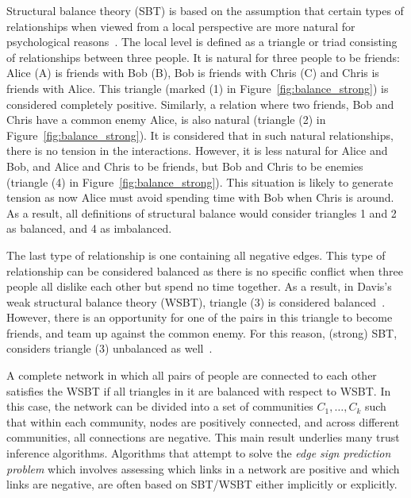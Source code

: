 Structural balance theory (SBT) is based on the assumption that
certain types of relationships when viewed from a local perspective
are more natural for psychological reasons~\cite{kleinberg-book}. The
local level is defined as a triangle or triad consisting of
relationships between three people.  It is natural for three people to
be friends: Alice (A) is friends with Bob (B), Bob is friends with
Chris (C) and Chris is friends with Alice. This triangle (marked (1)
in Figure~\ref{fig:balance_strong}) is considered completely
positive. Similarly, a relation where two friends, Bob and Chris have
a common enemy Alice, is also natural (triangle (2) in
Figure~\ref{fig:balance_strong}). It is considered that in such
natural relationships, there is no tension in the
interactions. However, it is less natural for Alice and Bob, and Alice
and Chris to be friends, but Bob and Chris to be enemies (triangle (4)
in Figure~\ref{fig:balance_strong}). This situation is likely to
generate tension as now Alice must avoid spending time with Bob when
Chris is around. As a result, all definitions of structural balance
would consider triangles 1 and 2 as balanced, and 4 as imbalanced.

The last type of relationship is one containing all negative
edges. This type of relationship can be considered balanced as there
is no specific conflict when three people all dislike each other but
spend no time together. As a result, in Davis's weak structural balance theory
(WSBT), triangle (3) is considered balanced~\cite{kleinberg-book}\cite{Davis:67}.  However, there is an
opportunity for one of the pairs in this triangle to become friends,
and team up against the common enemy. For this reason, (strong) SBT,
considers triangle (3) unbalanced as well~\cite{Cartwright:56}\cite{kleinberg-book}.

A complete network in which all pairs of people are connected to each
other satisfies the WSBT if all triangles in it are balanced with
respect to WSBT. In this case, the network can be divided into a set
of communities $C_1,\ldots, C_k$ such that within each community,
nodes are positively connected, and across different communities, all
connections are negative. This main result underlies many trust
inference algorithms. Algorithms that attempt to solve the {\it edge
  sign prediction problem} which involves assessing which links in a
network are positive and which links are negative, are often based on
SBT/WSBT either implicitly or explicitly.


